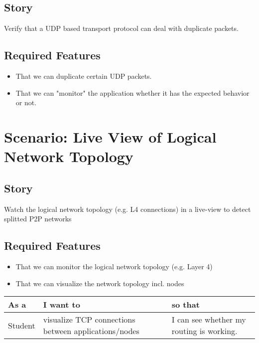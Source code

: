 \documentclass[a4paper,oneside]{book}
\begin{document}
\subsection{Story}
Verify that a UDP based transport protocol can deal with duplicate packets.
\subsection{Required Features}
\begin{itemize}
\item That we can duplicate certain UDP packets.
\item That we can "monitor" the application whether it has the expected behavior or not.
\end{itemize}


\section{Scenario: Live View of Logical Network Topology}
\subsection{Story}
Watch the logical network topology (e.g. L4 connections) in a live-view to detect splitted P2P networks
\subsection{Required Features}
\begin{itemize}
\item That we can monitor the logical network topology (e.g. Layer 4)
\item That we can visualize the network topology incl. nodes
\end{itemize}





\begin{tabular}{l p{5cm} p{5cm} }
As a & I want to & so that \\ \hline
Student & visualize TCP connections between applications/nodes & I can see whether my routing is working.
\end{tabular}
\end{document}
